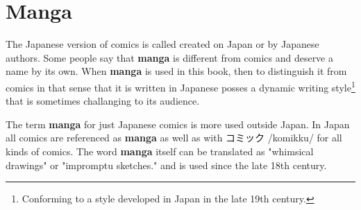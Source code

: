 \section{Manga} 
\label{sec:Manga}

The Japanese version of comics is called 
created on Japan or by Japanese authors. Some people say that \textbf{manga} is
different from comics and deserve a name by its own. When \textbf{manga} is
used in this book, then to distinguish it from comics in that sense that it is
written in Japanese posses a dynamic writing style\footnote{Conforming to a
style developed in Japan in the late 19th century.}  that is sometimes
challanging to its audience.

The term \textbf{manga} for just Japanese comics is more used outside Japan. In
Japan all comics are referenced as \textbf{manga} as well as with {コミック}
/komikku/ for all kinds of comics. The word \textbf{manga} itself can be
translated as "whimsical drawings" or "impromptu sketches." and is used since
the late 18th century.


